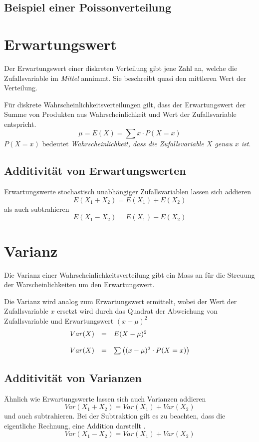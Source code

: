 \clearpage

\subsection{Beispiel einer Poissonverteilung}

\section{Erwartungswert}
Der Erwartungswert einer diskreten Verteilung gibt jene Zahl an,
welche die Zufallsvariable im \emph{Mittel} annimmt. Sie beschreibt
quasi den mittleren Wert der Verteilung.

Für diskrete Wahrscheinlichkeitsverteilungen gilt, dass der 
Erwartungswert der Summe von Produkten aus Wahrscheinlichkeit und
Wert der Zufallsvariable entspricht. 
\[ \mu = E(X) = \sum x \cdot P(X=x) \]
$P(X=x)$ bedeutet \emph{Wahrscheinlichkeit, dass die Zufallsvariable $X$ 
genau $x$ ist}.

\subsection{Additivität von Erwartungswerten}
Erwartungswerte stochastisch unabhängiger Zufallsvariablen lassen sich
addieren
\[  
	E(X_1 + X_2) = E(X_1) + E(X_2)
\]
als auch subtrahieren
\[  
	E(X_1 - X_2) = E(X_1) - E(X_2)
\]

\section{Varianz}
Die Varianz einer Wahrscheinlichkeitsverteilung gibt ein Mass an für 
die Streuung der Warscheinlichkeiten um den Erwartungswert.

Die Varianz wird analog zum Erwartungswert ermittelt, wobei der Wert
der Zufallsvariable $x$ ersetzt wird durch das Quadrat der Abweichung
von Zufallsvariable und Erwartungswert $(x-\mu)^2$
\[ \begin{array}{l c l}
	Var(X) 
		& = 
		& E(X-\mu)^2 \\
	& &  \\
	Var(X)
		& = 
		& \sum \left( (x-\mu)^2 \cdot P(X=x) \right)
\end{array} \]

\subsection{Additivität von Varianzen}
Ähnlich wie Erwartungswerte lassen sich auch Varianzen addieren
\[  
	Var(X_1 + X_2) = Var(X_1) + Var(X_2)
\]
und auch subtrahieren. Bei der Subtraktion gilt es zu beachten,
dass die eigentliche Rechnung, eine Addition darstellt
\parencite[231]{oreilly}.
\[  
	Var(X_1 - X_2) = Var(X_1) + Var(X_2)
\]

